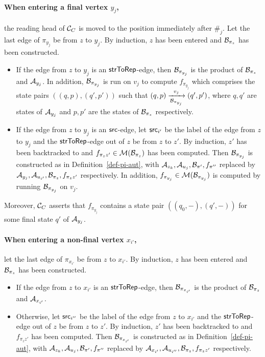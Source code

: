 \documentclass{llncs}
\begin{document}
\paragraph*{When entering a final vertex $y_j$,} the reading head of $\mathcal{C}_C$ is moved to the position immediately after $\#_j$.
%
Let the last edge of $\pi_{y_j}$ be from $z$ to $y_j$.  By induction, $z$ has been entered and $\mathcal{B}_{\pi_z}$ has been constructed. 
\begin{itemize}
\item If the edge from $z$ to $y_j$ is an $\mathsf{strToRep}$-edge, then $\mathcal{B}_{\pi_{y_j}}$ is the product of $\mathcal{B}_{\pi_z}$ and $\mathcal{A}_{y_j}$.  In addition,  $\mathcal{B}_{\pi_{y_j}}$ is run on $v_j$ to compute $f_{\pi_{y_j}}$ which comprises the state pairs $((q, p), (q', p'))$ such that $(q, p)  \xrightarrow[\mathcal{B}_{\pi_{y_j}}]{v_j} (q', p')$, where $q,q'$ are states of $\mathcal{A}_{y_j}$ and $p, p'$ are the states of $\mathcal{B}_{\pi_z}$ respectively. 
%
\item If the edge from $z$ to $y_j$ is an $\mathsf{src}$-edge, let $\mathsf{src}_{i'}$ be the label of the edge from $z$ to $y_j$ and the $\mathsf{strToRep}$-edge out of $z$ be from $z$ to $z'$. By induction, $z'$ has been backtracked to and $f_{\pi_z z'} \in \mathcal{M}(\mathcal{B}_{\pi_z})$ has been computed. Then $\mathcal{B}_{\pi_{y_j}}$ is constructed  as in Definition~\ref{def-pi-aut}, with $\mathcal{A}_{z_k}, \mathcal{A}_{u_j}, \mathcal{B}_{\pi'}, f_{\pi''}$ replaced by $\mathcal{A}_{y_j}, \mathcal{A}_{u_{i'}}, \mathcal{B}_{\pi_z}, f_{\pi_z z'}$ respectively. In addition, $f_{\pi_{y_j}} \in \mathcal{M}(\mathcal{B}_{\pi_{y_j}})$ is computed by running  $\mathcal{B}_{\pi_{y_j}}$ on $v_j$. 
\end{itemize}
Moreover, $\mathcal{C}_C$ asserts that $f_{\pi_{y_j}}$ contains a state pair $((q_0, -), (q', -))$ for some final state $q'$ of $\mathcal{A}_{y_j}$.



\paragraph*{When entering a non-final vertex $x_{i'}$,} let the last edge of $\pi_{x_{i'}}$ be from $z$ to $x_{i'}$.  By induction, $z$ has been entered and $\mathcal{B}_{\pi_z}$ has been constructed. 
\begin{itemize}
\item If the edge from $z$ to $x_{i'}$ is an $\mathsf{strToRep}$-edge, then $\mathcal{B}_{\pi_{x_{i'}}}$ is the product of $\mathcal{B}_{\pi_z}$ and $\mathcal{A}_{x_{i'}}$.
%
\item Otherwise, let $\mathsf{src}_{i''}$ be the label of the edge from $z$ to $x_{i'}$ and the $\mathsf{strToRep}$-edge out of $z$ be from $z$ to $z'$. By induction, $z'$ has been backtracked to and $f_{\pi_z z'}$ has been computed. Then $\mathcal{B}_{\pi_{x_{i'}}}$ is constructed as in Definition~\ref{def-pi-aut}, with $\mathcal{A}_{z_k}, \mathcal{A}_{u_j}, \mathcal{B}_{\pi'}, f_{\pi''}$ replaced by $\mathcal{A}_{x_{i'}}, \mathcal{A}_{u_{i''}}, \mathcal{B}_{\pi_z}, f_{\pi_z z'}$ respectively. 
\end{itemize}
\end{document}
